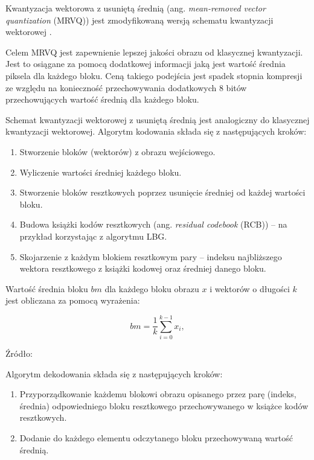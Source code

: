 \documentclass{article}
\begin{document}
Kwantyzacja wektorowa z usuniętą średnią (ang. \emph{mean-removed vector quantization} (MRVQ)) jest zmodyfikowaną wersją schematu kwantyzacji wektorowej \cite{meanremovedVQ}.

Celem MRVQ jest zapewnienie lepszej jakości obrazu od klasycznej kwantyzacji. Jest to osiągane za pomocą dodatkowej informacji jaką jest wartość średnia piksela dla każdego bloku. Ceną takiego podejścia jest spadek stopnia kompresji ze względu na konieczność przechowywania dodatkowych 8 bitów przechowujących wartość średnią dla każdego bloku.

Schemat kwantyzacji wektorowej z usuniętą średnią jest analogiczny do klasycznej kwantyzacji wektorowej. Algorytm kodowania składa się z następujących kroków:

\begin{enumerate}
  \item Stworzenie bloków (wektorów) z obrazu wejściowego.
  \item Wyliczenie wartości średniej każdego bloku.
  \item Stworzenie bloków resztkowych poprzez usunięcie średniej od każdej wartości bloku.
  \item Budowa książki kodów resztkowych (ang. \emph{residual codebook} (RCB)) -- na przykład korzystając z algorytmu LBG.
  \item Skojarzenie z każdym blokiem resztkowym pary -- indeksu najbliższego wektora resztkowego z książki kodowej oraz średniej danego bloku.
\end{enumerate}

Wartość średnia bloku $bm$ dla każdego bloku obrazu $x$ i wektorów o długości $k$ jest obliczana za pomocą wyrażenia: 

\begin{equation}
  bm = \frac{1}{k} \sum_{i=0}^{k-1} x_{i},
\end{equation}

Źródło: \cite{meanremovedVQ}

Algorytm dekodowania składa się z następujących kroków:

\begin{enumerate}
  \item Przyporządkowanie każdemu blokowi obrazu opisanego przez parę (indeks, średnia) odpowiedniego bloku resztkowego przechowywanego w książce kodów resztkowych.
  \item Dodanie do każdego elementu odczytanego bloku przechowywaną wartość średnią.
\end{enumerate}
\end{document}
